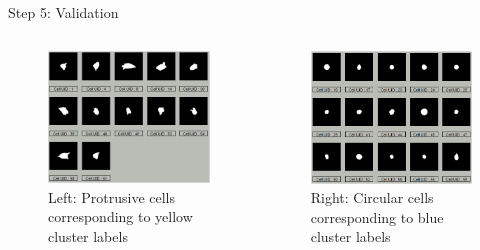\documentclass[final,hyperref={pdfpagelabels=false}]{beamer}
\begin{document}
\begin{frame}[t]
\begin{columns}[t]
\begin{column}{.465\textwidth}
\begin{block}{Step 5: Validation}
\begin{columns}
\begin{column}{.48\textwidth}
\centering
\begin{figure}
\includegraphics[width=0.99\linewidth]{cluster_fig3.png}
\captionsetup{justification=raggedright,singlelinecheck=false,labelformat=empty}
\caption{Left: Protrusive cells corresponding to yellow cluster labels}
\end{figure}
\end{column}

\begin{column}{.48\textwidth}
\centering
\begin{figure}
\includegraphics[width=0.99\linewidth]{cluster_fig4.png}
\captionsetup{justification=raggedright,singlelinecheck=false,labelformat=empty}
\caption{Right: Circular cells corresponding to blue cluster labels}
\end{figure}
\end{column}


\end{columns}
\end{block}
\end{column}
\end{columns}
\end{frame}
\end{document}
